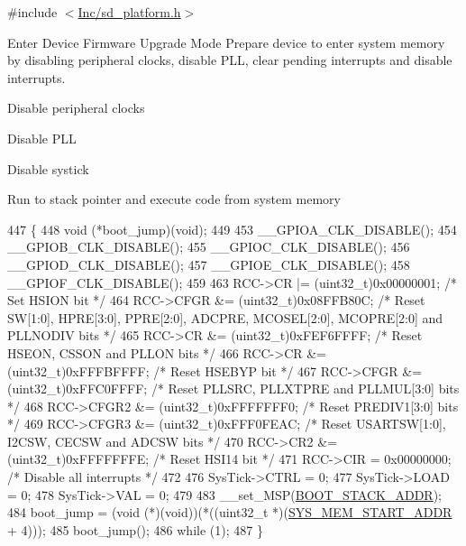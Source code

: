 {\ttfamily \#include $<$\mbox{\hyperlink{sd__platform_8h}{Inc/sd\+\_\+platform.\+h}}$>$}



Enter Device Firmware Upgrade Mode Prepare device to enter system memory by disabling peripheral clocks, disable P\+LL, clear pending interrupts and disable interrupts. 

Disable peripheral clocks

Disable P\+LL

Disable systick

Run to stack pointer and execute code from system memory
\begin{DoxyCode}
447 \{
448     void (*boot\_jump)(void);
449     
453     \_\_GPIOA\_CLK\_DISABLE();
454     \_\_GPIOB\_CLK\_DISABLE();
455     \_\_GPIOC\_CLK\_DISABLE();
456     \_\_GPIOD\_CLK\_DISABLE();
457     \_\_GPIOE\_CLK\_DISABLE();
458     \_\_GPIOF\_CLK\_DISABLE();
459     
463     RCC->CR    |= (uint32\_t)0x00000001; \textcolor{comment}{/* Set HSION bit */}
464     RCC->CFGR  &= (uint32\_t)0x08FFB80C; \textcolor{comment}{/* Reset SW[1:0], HPRE[3:0], PPRE[2:0], ADCPRE, MCOSEL[2:0],
       MCOPRE[2:0] and PLLNODIV bits */}
465     RCC->CR    &= (uint32\_t)0xFEF6FFFF; \textcolor{comment}{/* Reset HSEON, CSSON and PLLON bits */}
466     RCC->CR    &= (uint32\_t)0xFFFBFFFF; \textcolor{comment}{/* Reset HSEBYP bit */}
467     RCC->CFGR  &= (uint32\_t)0xFFC0FFFF; \textcolor{comment}{/* Reset PLLSRC, PLLXTPRE and PLLMUL[3:0] bits */}
468     RCC->CFGR2 &= (uint32\_t)0xFFFFFFF0; \textcolor{comment}{/* Reset PREDIV1[3:0] bits */}
469     RCC->CFGR3 &= (uint32\_t)0xFFF0FEAC; \textcolor{comment}{/* Reset USARTSW[1:0], I2CSW, CECSW and ADCSW bits */}
470     RCC->CR2   &= (uint32\_t)0xFFFFFFFE; \textcolor{comment}{/* Reset HSI14 bit */}
471     RCC->CIR    = 0x00000000;       \textcolor{comment}{/* Disable all interrupts */}
472     
476     SysTick->CTRL = 0;
477     SysTick->LOAD = 0;
478     SysTick->VAL = 0;
479     
483     \_\_set\_MSP(\mbox{\hyperlink{group___s_d___d_f_u___defines_ga21b3d67021ba56888c69720267842d0b}{BOOT\_STACK\_ADDR}});
484     boot\_jump = (void (*)(void))(*((uint32\_t *)(\mbox{\hyperlink{group___s_d___d_f_u___defines_ga15f619642ddd540adedf01b2c32eb950}{SYS\_MEM\_START\_ADDR}} + 4)));
485     boot\_jump();
486     \textcolor{keywordflow}{while} (1);
487 \}
\end{DoxyCode}
\mbox{\label{group___s_d___platform___function___declarations_gaa03f4625c66a0fe3be62a6aead8ac2ba}} 
